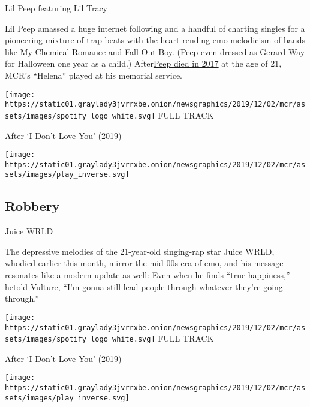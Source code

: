 Lil Peep featuring Lil Tracy

Lil Peep amassed a huge internet following and a handful of charting
singles for a pioneering mixture of trap beats with the heart-rending
emo melodicism of bands like My Chemical Romance and Fall Out Boy. (Peep
even dressed as Gerard Way for Halloween one year as a child.)
After\href{https://www.nytimes3xbfgragh.onion/2017/11/16/obituaries/lil-peep-dead.html}{}\href{https://www.nytimes3xbfgragh.onion/2017/11/16/obituaries/lil-peep-dead.html}{Peep
died in 2017} at the age of 21, MCR's ``Helena'' played at his memorial
service.

\href{https://open.spotify.com/track/7Hr2XoaGpIMKbNXCZDZ3le?si=I5-OzF8CTx-ckpaPHi44TQ}{}

\texttt{[image: https://static01.graylady3jvrrxbe.onion/newsgraphics/2019/12/02/mcr/assets/images/spotify\_logo\_white.svg]}
FULL TRACK

After `I Don't Love You' (2019)

\texttt{[image: https://static01.graylady3jvrrxbe.onion/newsgraphics/2019/12/02/mcr/assets/images/play\_inverse.svg]}

\hypertarget{robbery}{%
\subsection{Robbery}\label{robbery}}

Juice WRLD

The depressive melodies of the 21-year-old singing-rap star Juice WRLD,
who\href{https://www.nytimes3xbfgragh.onion/2019/12/08/arts/music/juice-wrld-dead.html}{}\href{https://www.nytimes3xbfgragh.onion/2019/12/08/arts/music/juice-wrld-dead.html}{died
earlier this month}, mirror the mid-00s era of emo, and his message
resonates like a modern update as well: Even when he finds ``true
happiness,''
he\href{https://www.vulture.com/2019/03/juice-wrld-profile.html}{}\href{https://www.vulture.com/2019/03/juice-wrld-profile.html}{told
Vulture}, ``I'm gonna still lead people through whatever they're going
through.''

\href{https://open.spotify.com/track/6Hj9jySrnFppAI0sEMCZpJ?si=uX8mOdUITwCykkgTZWqQZw}{}

\texttt{[image: https://static01.graylady3jvrrxbe.onion/newsgraphics/2019/12/02/mcr/assets/images/spotify\_logo\_white.svg]}
FULL TRACK

After `I Don't Love You' (2019)

\texttt{[image: https://static01.graylady3jvrrxbe.onion/newsgraphics/2019/12/02/mcr/assets/images/play\_inverse.svg]}

